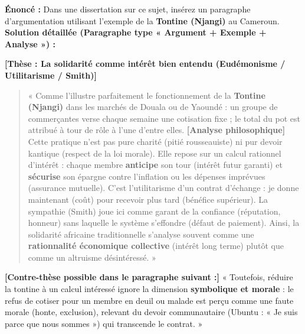 \documentclass[11pt]{article}
\newcommand{\cle}[1]{{\popxbold\color{popdark}#1}}
\begin{document}
\begin{exoresolu}
\textbf{Énoncé :} Dans une dissertation sur ce sujet, insérez un paragraphe d'argumentation utilisant l'exemple de la \textbf{Tontine (Njangi)} au Cameroun.
\tcblower
\textbf{Solution détaillée (Paragraphe type « Argument + Exemple + Analyse ») :}

\textbf{[Thèse : La solidarité comme intérêt bien entendu (Eudémonisme / Utilitarisme / Smith)]}
\begin{quote}
« Comme l'illustre parfaitement le fonctionnement de la \textbf{Tontine (Njangi)} dans les marchés de Douala ou de Yaoundé : un groupe de commerçantes verse chaque semaine une cotisation fixe ; le total du pot est attribué à tour de rôle à l'une d'entre elles.
\textbf{[Analyse philosophique]} Cette pratique n'est pas pure charité (pitié rousseauiste) ni pur devoir kantique (respect de la loi morale). Elle repose sur un \cle{calcul rationnel d'intérêt} : chaque membre \textbf{anticipe} son tour (intérêt futur garanti) et \textbf{sécurise} son épargne contre l'inflation ou les dépenses imprévues (assurance mutuelle). C'est l'\cle{utilitarisme} d'un \cle{contrat d'échange} : je donne maintenant (coût) pour recevoir plus tard (bénéfice supérieur). La \cle{sympathie} (Smith) joue ici comme \cle{garant de la confiance} (réputation, honneur) sans laquelle le système s'effondre (défaut de paiement). Ainsi, la solidarité africaine traditionnelle s'analyse souvent comme une \textbf{rationnalité économique collective} (intérêt long terme) plutôt que comme un altruisme désintéressé. »
\end{quote}

\textbf{[Contre-thèse possible dans le paragraphe suivant :]} « Toutefois, réduire la tontine à un calcul intéressé ignore la dimension \textbf{symbolique et morale} : le refus de cotiser pour un membre en deuil ou malade est perçu comme une \cle{faute morale} (honte, exclusion), relevant du \cle{devoir} communautaire (Ubuntu : « Je suis parce que nous sommes ») qui transcende le contrat. »
\end{exoresolu}
\end{document}
